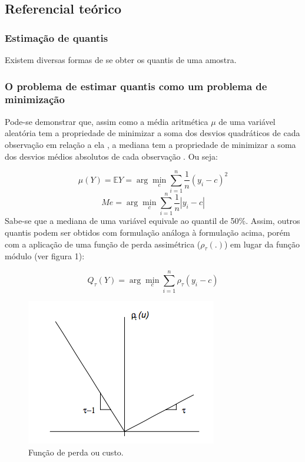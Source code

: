 \documentclass[a4paper, 12pt]{article}
\begin{document}
\hypertarget{referencial-teorico}{%
\subsection{Referencial teórico}\label{referencial-teorico}}

\hypertarget{estimacao-de-quantis}{%
\subsubsection{Estimação de quantis}\label{estimacao-de-quantis}}

Existem diversas formas de se obter os quantis de uma amostra.

\hypertarget{o-problema-de-estimar-quantis-como-um-problema-de-minimizacao}{%
\subsubsection{O problema de estimar quantis como um problema de
minimização}\label{o-problema-de-estimar-quantis-como-um-problema-de-minimizacao}}

Pode-se demonstrar que, assim como a média aritmética \(\mu\) de uma
variável aleatória tem a propriedade de minimizar a soma dos desvios
quadráticos de cada observação em relação a ela
\autocite[50]{matloff2017}, a mediana tem a propriedade de minimizar a
soma dos desvios médios absolutos de cada observação
\autocite[260]{matloff2017}. Ou seja:

\[\mu(Y) = \mathbb{E}Y = \arg \min_c \sum_{i = 1}^n \frac{1}{n}(y_i - c)^2\]
\[Me = \arg \min_c \sum_{i = 1}^n \frac{1}{n}|y_i - c|\] Sabe-se que a
mediana de uma variável equivale ao quantil de 50\%. Assim, outros
quantis podem ser obtidos com formulação análoga à formulação acima,
porém com a aplicação de uma função de perda assimétrica
(\(\rho_\tau(.)\)) em lugar da função módulo (ver figura 1):

\[Q_\tau(Y) = \arg \min_c \sum_{i = 1}^n \rho_\tau(y_i - c)\]

\begin{figure}[H]

{\centering \includegraphics[width=0.7\linewidth]{DmKq7} 

}

\caption{Função de perda ou custo.}\label{fig:unnamed-chunk-1}
\end{figure}
\end{document}
